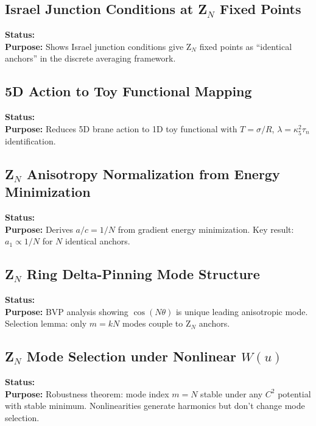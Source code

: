 \subsection*{Israel Junction Conditions at Z$_N$ Fixed Points}
\textbf{Status:} \tagDer{} \\
\textbf{Purpose:} Shows Israel junction conditions give Z$_N$ fixed points as
``identical anchors'' in the discrete averaging framework.



\subsection*{5D Action to Toy Functional Mapping}
\textbf{Status:} \tagDc{} \\
\textbf{Purpose:} Reduces 5D brane action to 1D toy functional with
$T = \sigma/R$, $\lambda = \kappa_5^2 \tau_n$ identification.



\subsection*{Z$_N$ Anisotropy Normalization from Energy Minimization}
\textbf{Status:} \tagDer{} \\
\textbf{Purpose:} Derives $a/c = 1/N$ from gradient energy minimization.
Key result: $a_1 \propto 1/N$ for $N$ identical anchors.



\subsection*{Z$_N$ Ring Delta-Pinning Mode Structure}
\textbf{Status:} \tagDer{} \\
\textbf{Purpose:} BVP analysis showing $\cos(N\theta)$ is unique leading
anisotropic mode. Selection lemma: only $m = kN$ modes couple to Z$_N$ anchors.



\subsection*{Z$_N$ Mode Selection under Nonlinear $W(u)$}
\textbf{Status:} \tagDer{} \\
\textbf{Purpose:} Robustness theorem: mode index $m = N$ stable under any
$C^2$ potential with stable minimum. Nonlinearities generate harmonics but
don't change mode selection.


